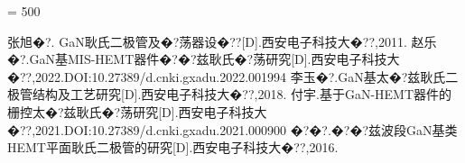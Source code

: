 \documentclass{zjureport}
\begin{document}





% 

\clearpage
{}
{}
\tolerance = 500

\begin{thebibliography}{99}
	张旭�?. GaN耿氏二极管及�?荡器设�??[D].西安电子科技大�??,2011.
	赵乐�?.GaN基MIS-HEMT器件�?�?兹耿氏�?荡研究[D].西安电子科技大�??,2022.DOI:10.27389/d.cnki.gxadu.2022.001994
	李玉�?.GaN基太�?兹耿氏二极管结构及工艺研究[D].西安电子科技大�??,2018.
	付宇.基于GaN-HEMT器件的栅控太�?兹耿氏�?荡研究[D].西安电子科技大�??,2021.DOI:10.27389/d.cnki.gxadu.2021.000900
	�?�?.�?�?兹波段GaN基类HEMT平面耿氏二极管的研究[D].西安电子科技大�??,2016.
\end{thebibliography}
\end{document}

